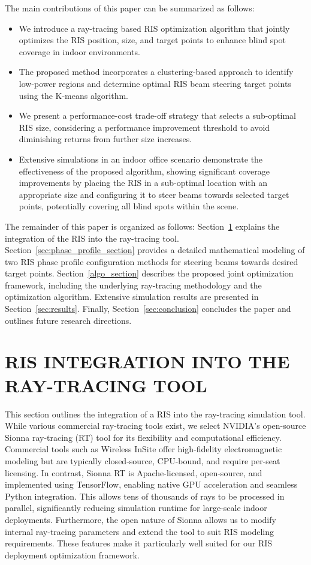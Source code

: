 \documentclass{IEEEoj}
\begin{document}
The main contributions of this paper can be summarized as follows:
\begin{itemize}
	\item We introduce a ray-tracing based RIS optimization algorithm that jointly optimizes the RIS position, size, and target points to enhance blind spot coverage in indoor environments.
	\item The proposed method incorporates a clustering-based approach to identify low-power regions and determine optimal RIS beam steering target points using the K-means algorithm.
	\item We present a performance-cost trade-off strategy that selects a sub-optimal RIS size, considering a performance improvement threshold to avoid diminishing returns from further size increases.
	\item Extensive simulations in an indoor office scenario demonstrate the effectiveness of the proposed algorithm, showing significant coverage improvements by placing the RIS in a sub-optimal location with an appropriate size and configuring it to steer beams towards selected target points, potentially covering all blind spots within the scene.
\end{itemize}

The remainder of this paper is organized as follows: Section~\ref{sec:ris_integration_into_RT} explains the integration of the RIS into the ray-tracing tool. Section~\ref{sec:phase_profile_section} provides a detailed mathematical modeling of two RIS phase profile configuration methods for steering beams towards desired target points. Section~\ref{algo_section} describes the proposed joint optimization framework, including the underlying ray-tracing methodology and the optimization algorithm. Extensive simulation results are presented in Section~\ref{sec:results}. Finally, Section~\ref{sec:conclusion} concludes the paper and outlines future research directions.

\section{RIS INTEGRATION INTO THE RAY-TRACING TOOL} \label{sec:ris_integration_into_RT}
This section outlines the integration of a RIS into the ray-tracing simulation tool. While various commercial ray-tracing tools exist, we select NVIDIA’s open-source Sionna ray-tracing (RT) tool \cite{sionna} for its flexibility and computational efficiency. Commercial tools such as Wireless InSite \cite{wireless_insite} offer high-fidelity electromagnetic modeling but are typically closed-source, CPU-bound, and require per-seat licensing. In contrast, Sionna RT is Apache-licensed, open-source, and implemented using TensorFlow, enabling native GPU acceleration and seamless Python integration. This allows tens of thousands of rays to be processed in parallel, significantly reducing simulation runtime for large-scale indoor deployments. Furthermore, the open nature of Sionna allows us to modify internal ray-tracing parameters and extend the tool to suit RIS modeling requirements. These features make it particularly well suited for our RIS deployment optimization framework.
\end{document}
